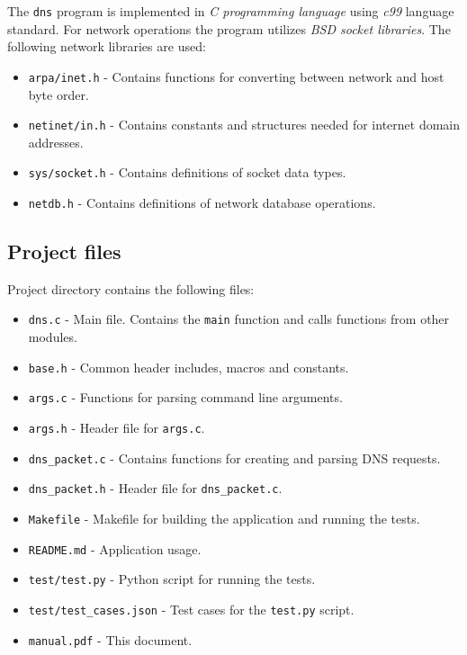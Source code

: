 \documentclass[a4paper, 11pt]{article}
\begin{document}
    The \texttt{dns} program is implemented in \emph{C programming language} using \emph{c99} language standard.
    For network operations the program utilizes \emph{BSD socket libraries}.
    The following network libraries are used:
    \begin{itemize}
        \item \texttt{arpa/inet.h} - Contains functions for converting between network and host byte order.
        \item \texttt{netinet/in.h} - Contains constants and structures needed for internet domain addresses.
        \item \texttt{sys/socket.h} - Contains definitions of socket data types.
        \item \texttt{netdb.h} - Contains definitions of network database operations.
    \end{itemize}

    \subsection{Project files}
        Project directory contains the following files:
        \begin{itemize}
            \item \texttt{dns.c} - Main file. Contains the \texttt{main} function and calls functions from other modules.
            \item \texttt{base.h} - Common header includes, macros and constants.
            \item \texttt{args.c} - Functions for parsing command line arguments.
            \item \texttt{args.h} - Header file for \texttt{args.c}.
            \item \texttt{dns\_packet.c} - Contains functions for creating and parsing DNS requests.
            \item \texttt{dns\_packet.h} - Header file for \texttt{dns\_packet.c}.
            \item \texttt{Makefile} - Makefile for building the application and running the tests.
            \item \texttt{README.md} - Application usage.
            \item \texttt{test/test.py} - Python script for running the tests.
            \item \texttt{test/test\_cases.json} - Test cases for the \texttt{test.py} script.
            \item \texttt{manual.pdf} - This document.
        \end{itemize}
\end{document}
